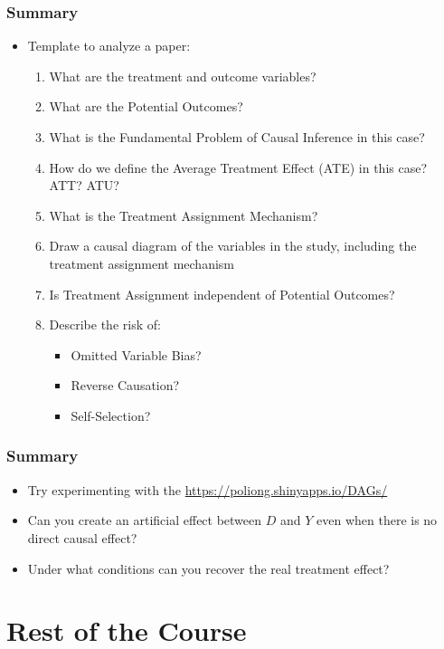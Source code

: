 \documentclass[xcolor=x11names,compress]{beamer}\usepackage[]{graphicx}\usepackage[]{color}
\renewcommand{\(}{\begin{columns}}
\renewcommand{\)}{\end{columns}}
\newcommand{\<}[1]{\begin{column}{#1}}
\renewcommand{\>}{\end{column}}
\begin{document}
\begin{frame}
\frametitle{Summary}
\begin{itemize}
\item Template to analyze a paper:
\begin{enumerate}
\item What are the treatment and outcome variables?
\pause
\item What are the Potential Outcomes?
\pause
\item What is the Fundamental Problem of Causal Inference in this case?
\pause
\item How do we define the Average Treatment Effect (ATE) in this case? ATT? ATU?
\pause
\item What is the Treatment Assignment Mechanism?
\pause
\item Draw a causal diagram of the variables in the study, including the treatment assignment mechanism
\pause
\item Is Treatment Assignment independent of Potential Outcomes?
\pause
\item Describe the risk of:
\begin{itemize}
\item Omitted Variable Bias?
\pause
\item Reverse Causation?
\pause
\item Self-Selection?
\end{itemize}
\end{enumerate}
\end{itemize}
\end{frame}



\begin{frame}
\frametitle{Summary}
\begin{itemize}
\item Try experimenting with the \href{Causal Relationships App here}{https://poliong.shinyapps.io/DAGs/}
\pause
\item Can you create an artificial effect between $D$ and $Y$ even when there is no direct causal effect?
\pause
\item Under what conditions can you recover the real treatment effect?
\end{itemize}
\end{frame}

\section{Rest of the Course}
\end{document}
